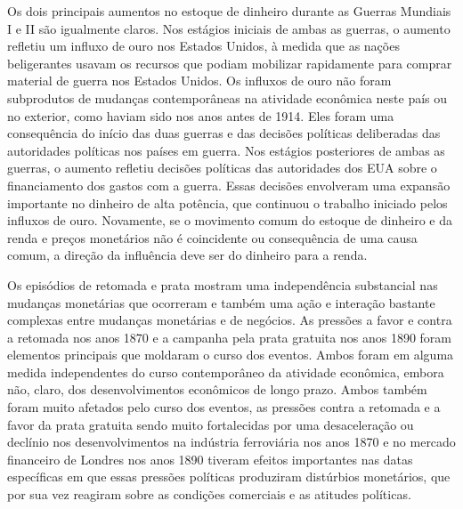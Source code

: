 \documentclass[a4paper,12pt]{article}[abntex2]
\begin{document}
Os dois principais aumentos no estoque de dinheiro durante as Guerras Mundiais I e II são igualmente claros. Nos estágios iniciais de ambas as guerras, o aumento refletiu um influxo de ouro nos Estados Unidos, à medida que as nações beligerantes usavam os recursos que podiam mobilizar rapidamente para comprar material de guerra nos Estados Unidos. Os influxos de ouro não foram subprodutos de mudanças contemporâneas na atividade econômica neste país ou no exterior, como haviam sido nos anos antes de 1914. Eles foram uma consequência do início das duas guerras e das decisões políticas deliberadas das autoridades políticas nos países em guerra. Nos estágios posteriores de ambas as guerras, o aumento refletiu decisões políticas das autoridades dos EUA sobre o financiamento dos gastos com a guerra. Essas decisões envolveram uma expansão importante no dinheiro de alta potência, que continuou o trabalho iniciado pelos influxos de ouro. Novamente, se o movimento comum do estoque de dinheiro e da renda e preços monetários não é coincidente ou consequência de uma causa comum, a direção da influência deve ser do dinheiro para a renda.

Os episódios de retomada e prata mostram uma independência substancial nas mudanças monetárias que ocorreram e também uma ação e interação bastante complexas entre mudanças monetárias e de negócios. As pressões a favor e contra a retomada nos anos 1870 e a campanha pela prata gratuita nos anos 1890 foram elementos principais que moldaram o curso dos eventos. Ambos foram em alguma medida independentes do curso contemporâneo da atividade econômica, embora não, claro, dos desenvolvimentos econômicos de longo prazo. Ambos também foram muito afetados pelo curso dos eventos, as pressões contra a retomada e a favor da prata gratuita sendo muito fortalecidas por uma desaceleração ou declínio nos desenvolvimentos na indústria ferroviária nos anos 1870 e no mercado financeiro de Londres nos anos 1890 tiveram efeitos importantes nas datas específicas em que essas pressões políticas produziram distúrbios monetários, que por sua vez reagiram sobre as condições comerciais e as atitudes políticas.
\end{document}
